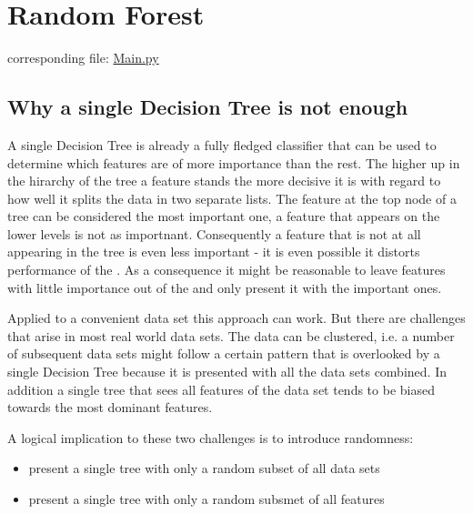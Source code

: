 \documentclass[letterpaper,10pt,english]{sphinxmanual}
\begin{document}
\begin{figure}[htbp]
\centering

\noindent{}
\label{\detokenize{DT:blank}}\end{figure}


\section{Random Forest}
\label{\detokenize{RF:random-forest}}\label{\detokenize{RF::doc}}\label{\detokenize{RF:id1}}
corresponding file: \href{https://github.com/weinertmos/ForestFire/blob/master/source/ForestFire/Main.py}{Main.py}


\subsection{Why a single Decision Tree is not enough}
\label{\detokenize{RF:why-a-single-decision-tree-is-not-enough}}
A single Decision Tree is already a fully fledged classifier that can be used to determine which features are of more importance than the rest.
The higher up in the hirarchy of the tree a feature stands the more decisive it is with regard to how well it splits the data in two separate lists.
The feature at the top node of a tree can be considered the most important one, a feature that appears on the lower levels is not as importnant.
Consequently a feature that is not at all appearing in the tree is even less important - it is even possible it distorts performance of the {\hyperref[\detokenize{Overview:mla}]{}}.
As a consequence it might be reasonable to leave features with little importance out of the {\hyperref[\detokenize{Overview:mla}]{}} and only present it with the important ones.

Applied to a convenient data set this approach can work.
But there are challenges that arise in most real world data sets.
The data can be clustered, i.e. a number of subsequent data sets might follow a certain pattern that is overlooked by a single Decision Tree because it is presented with all the data sets combined.
In addition a single tree that sees all features of the data set tends to be biased towards the most dominant features.

A logical implication to these two challenges is to introduce randomness:
\begin{itemize}
\item {} 
present a single tree with only a random subset of all data sets

\item {} 
present a single tree with only a random subsmet of all features

\end{itemize}
\end{document}
